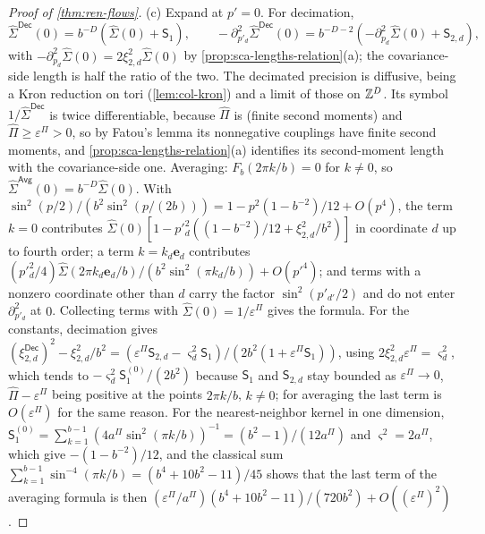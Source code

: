 \begin{proof}[Proof of \cref{thm:ren-flows}]
(c) Expand at $p'=0$. For decimation,
\[
\hat\Sigma^{\mathsf{Dec}}(0)=b^{-D}(\hat\Sigma(0)+\mathsf S_1),\qquad-\partial^2_{p'_d}\hat\Sigma^{\mathsf{Dec}}(0)=b^{-D-2}(-\partial^2_{p_d}\hat\Sigma(0)+\mathsf S_{2,d}),
\]
with $-\partial^2_{p_d}\hat\Sigma(0)=2\xi^2_{2,d}\hat\Sigma(0)$ by \cref{prop:sca-lengths-relation}(a); the covariance-side length is half the ratio of the two. The decimated precision is diffusive, being a Kron reduction on tori (\cref{lem:col-kron}) and a limit of those on $\mathbb{Z}^D$. Its symbol $1/\hat\Sigma^{\mathsf{Dec}}$ is twice differentiable, because $\hat\Pi$ is (finite second moments) and $\hat\Pi\ge\varepsilon^\Pi>0$, so by Fatou's lemma its nonnegative couplings have finite second moments, and \cref{prop:sca-lengths-relation}(a) identifies its second-moment length with the covariance-side one. Averaging: $F_b(2\pi k/b)=0$ for $k\neq0$, so $\hat\Sigma^{\mathsf{Avg}}(0)=b^{-D}\hat\Sigma(0)$. With $\sin^2(p/2)/(b^2\sin^2(p/(2b)))=1-p^2(1-b^{-2})/12+O(p^4)$, the term $k=0$ contributes $\hat\Sigma(0)[1-p'^2_d((1-b^{-2})/12+\xi^2_{2,d}/b^2)]$ in coordinate $d$ up to fourth order; a term $k=k_d\mathbf e_d$ contributes $(p'^2_d/4)\hat\Sigma(2\pi k_d\mathbf e_d/b)/(b^2\sin^2(\pi k_d/b))+O(p'^4)$; and terms with a nonzero coordinate other than $d$ carry the factor $\sin^2(p'_{d'}/2)$ and do not enter $\partial^2_{p'_d}$ at $0$. Collecting terms with $\hat\Sigma(0)=1/\varepsilon^\Pi$ gives the formula. For the constants, decimation gives $(\xi^{\mathsf{Dec}}_{2,d})^2-\xi^2_{2,d}/b^2=(\varepsilon^\Pi\mathsf S_{2,d}-\varsigma_d^2\mathsf S_1)/(2b^2(1+\varepsilon^\Pi\mathsf S_1))$, using $2\xi^2_{2,d}\varepsilon^\Pi=\varsigma_d^2$, which tends to $-\varsigma_d^2\mathsf S^{(0)}_1/(2b^2)$ because $\mathsf S_1$ and $\mathsf S_{2,d}$ stay bounded as $\varepsilon^\Pi\to0$, $\hat\Pi-\varepsilon^\Pi$ being positive at the points $2\pi k/b$, $k\neq0$; for averaging the last term is $O(\varepsilon^\Pi)$ for the same reason. For the nearest-neighbor kernel in one dimension, $\mathsf S^{(0)}_1=\sum_{k=1}^{b-1}(4a^\Pi\sin^2(\pi k/b))^{-1}=(b^2-1)/(12a^\Pi)$ and $\varsigma^2=2a^\Pi$, which give $-(1-b^{-2})/12$, and the classical sum $\sum_{k=1}^{b-1}\sin^{-4}(\pi k/b)=(b^4+10b^2-11)/45$ shows that the last term of the averaging formula is then $(\varepsilon^\Pi/a^\Pi)(b^4+10b^2-11)/(720b^2)+O((\varepsilon^\Pi)^2)$.
\end{proof}

